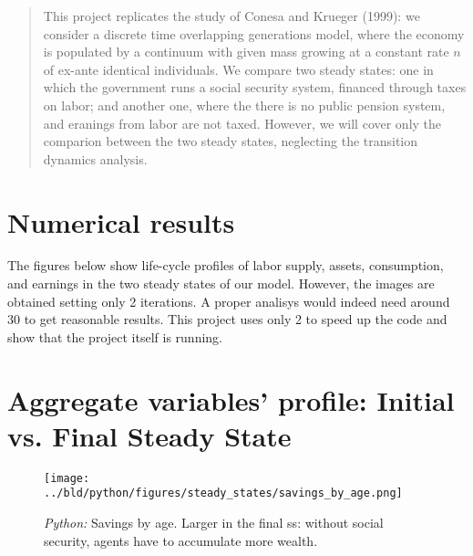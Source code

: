 

\date{
    31st March 2023
}

\maketitle


\begin{abstract}
    This project replicates the study of Conesa and Krueger (1999): we consider a discrete time overlapping generations model, 
    where the economy is populated by a continuum with given mass 
    growing at a constant rate $n$ of ex-ante identical individuals.
    We compare two steady states: 
    one in which the government runs a social security system, financed 
    through taxes on labor; and another one, where the there is no public 
    pension system, and eranings from labor are not taxed. However, we will cover only 
    the comparion between the two steady states, neglecting the transition dynamics analysis.
\end{abstract}

\clearpage


\section{Numerical results} %
The figures below show life-cycle profiles of labor supply, assets, consumption, and earnings in the two steady states of
our model. However, the images are obtained setting only 2 iterations. A proper analisys would indeed need around 30 to get reasonable results.
This project uses only 2 to speed up the code and show that the project itself is running.

\begin{table}[!htb]

\end{table}
\section{Aggregate variables' profile: Initial vs. Final Steady State}

\begin{figure}

    \centering
    \texttt{[image: ../bld/python/figures/steady\_states/savings\_by\_age.png]}
    \caption{\emph{Python:} Savings by age. Larger in the final ss: without social security, agents have to accumulate more wealth.}
    \label{fig:python-K}
\end{figure}

